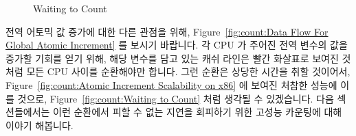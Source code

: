 \begin{figure}[tb]
\centering
{}
\caption{Waiting to Count}
\end{figure}

전역 어토믹 값 증가에 대한 다른 관점을 위해,
Figure~\ref{fig:count:Data Flow For Global Atomic Increment}
를 보시기 바랍니다.
각 CPU 가 주어진 전역 변수의 값을 증가할 기회를 얻기 위해, 해당 변수를 담고
있는 캐쉬 라인은 빨간 화살표로 보여진 것처럼 모든 CPU 사이를 순환해야만 합니다.
그런 순환은 상당한 시간을 취할 것이어서,
Figure~\ref{fig:count:Atomic Increment Scalability on x86}
에 보여진 처참한 성능에 이를 것으로,
Figure~\ref{fig:count:Waiting to Count}
처럼 생각될 수 있겠습니다.
다음 섹션들에서는 이런 순환에서 피할 수 없는 지연을 회피하기 위한 고성능
카운팅에 대해 이야기 해봅니다.


